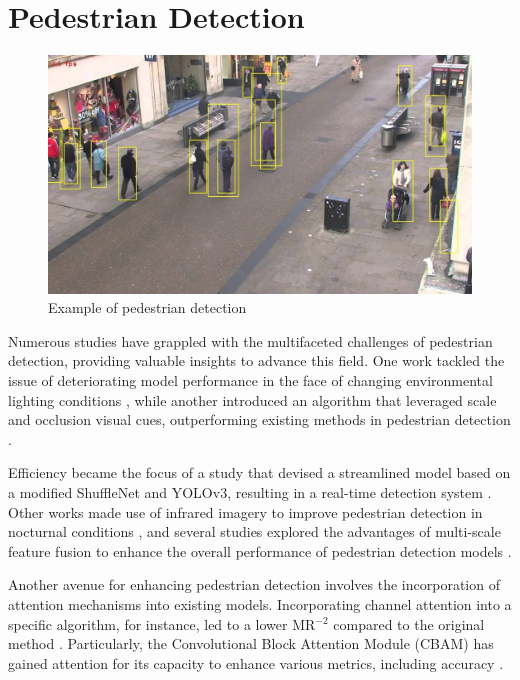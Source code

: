 \section{Pedestrian Detection} \label{pedestrian}

\begin{figure}[!htbp]
    \centering
    \centerline{\includegraphics[width=0.8\linewidth]
    {images/pedestrian_detection.jpg}}
    \caption{Example of pedestrian detection \cite{agarwalPedestrianDetectionCount2021}}
    \label{fig:pedestrian_ex}
\end{figure}

Numerous studies have grappled with the multifaceted challenges of pedestrian detection, providing valuable insights to advance this field. One work tackled the issue of deteriorating model performance in the face of changing environmental lighting conditions \cite{kruthiventiLowlightPedestrianDetection2017}, while another introduced an algorithm that leveraged scale and occlusion visual cues, outperforming existing methods in pedestrian detection \cite{wangPedestrianDetectionCrowded2016}.

Efficiency became the focus of a study that devised a streamlined model based on a modified ShuffleNet and YOLOv3, resulting in a real-time detection system \cite{xuEfficientPedestrianDetection2022}. Other works made use of infrared imagery to improve pedestrian detection in nocturnal conditions \cite{parkRobustThermalInfrared2022, liInfraredImagePedestrian2021}, and several studies explored the advantages of multi-scale feature fusion to enhance the overall performance of pedestrian detection models \cite{chenMultiscaleFeatureFusion2023, huangPedestrianDetectionBased2022, fuPedestrianDetectionMethod2022, mengMPDFFMultisourcePedestrian2022}.

Another avenue for enhancing pedestrian detection involves the incorporation of attention mechanisms into existing models. Incorporating channel attention into a specific algorithm, for instance, led to a lower MR$^{-2}$ compared to the original method \cite{liPedestrianDetectionAlgorithm2021}. Particularly, the Convolutional Block Attention Module (CBAM) has gained attention for its capacity to enhance various metrics, including accuracy \cite{fengPedestrianDetectionBased2020, fanImprovedYOLOv5Algorithm2022, chenMultiscaleFeatureFusion2023}.


